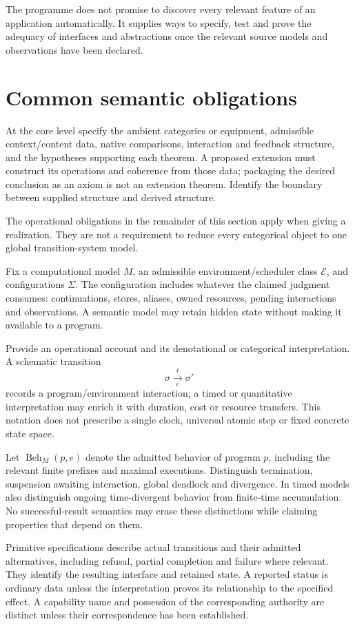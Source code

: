 \documentclass[11pt,a4paper]{article}
\newcommand{\Beh}{\operatorname{Beh}}
\begin{document}
The programme does not promise to discover every relevant feature of an application automatically. It supplies ways to specify, test and prove the adequacy of interfaces and abstractions once the relevant source models and observations have been declared.

\section{Common semantic obligations}\label{sec:semantic}
At the core level specify the ambient categories or equipment, admissible context/content data, native comparisons, interaction and feedback structure, and the hypotheses supporting each theorem. A proposed extension must construct its operations and coherence from those data; packaging the desired conclusion as an axiom is not an extension theorem. Identify the boundary between supplied structure and derived structure.

The operational obligations in the remainder of this section apply when giving a realization. They are not a requirement to reduce every categorical object to one global transition-system model.

Fix a computational model \(M\), an admissible environment/scheduler class \(\mathcal E\), and configurations \(\Sigma\). The configuration includes whatever the claimed judgment consumes: continuations, stores, aliases, owned resources, pending interactions and observations. A semantic model may retain hidden state without making it available to a program.

Provide an operational account and its denotational or categorical interpretation. A schematic transition
\[
\sigma\xrightarrow[\ e\ ]{\ell}\sigma'
\]
records a program/environment interaction; a timed or quantitative interpretation may enrich it with duration, cost or resource transfers. This notation does not prescribe a single clock, universal atomic step or fixed concrete state space.

Let \(\Beh_M(p,e)\) denote the admitted behavior of program \(p\), including the relevant finite prefixes and maximal executions. Distinguish termination, suspension awaiting interaction, global deadlock and divergence. In timed models also distinguish ongoing time-divergent behavior from finite-time accumulation. No successful-result semantics may erase these distinctions while claiming properties that depend on them.

Primitive specifications describe actual transitions and their admitted alternatives, including refusal, partial completion and failure where relevant. They identify the resulting interface and retained state. A reported status is ordinary data unless the interpretation proves its relationship to the specified effect. A capability name and possession of the corresponding authority are distinct unless their correspondence has been established.
\end{document}
